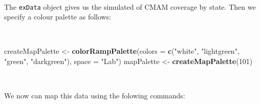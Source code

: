 \documentclass[12pt,a4paper,a4paper]{book}
\newenvironment{Shaded}{\begin{snugshade}}{\end{snugshade}}
\newcommand{\KeywordTok}[1]{\textcolor[rgb]{0.13,0.29,0.53}{\textbf{#1}}}
\newcommand{\DataTypeTok}[1]{\textcolor[rgb]{0.13,0.29,0.53}{#1}}
\newcommand{\DecValTok}[1]{\textcolor[rgb]{0.00,0.00,0.81}{#1}}
\newcommand{\StringTok}[1]{\textcolor[rgb]{0.31,0.60,0.02}{#1}}
\newcommand{\OperatorTok}[1]{\textcolor[rgb]{0.81,0.36,0.00}{\textbf{#1}}}
\newcommand{\NormalTok}[1]{#1}
\theoremstyle{definition}
\theoremstyle{definition}
\theoremstyle{definition}
\theoremstyle{remark}
\begin{document}
\begin{Shaded}
\end{Shaded}

~

The \texttt{exData} object gives us the simulated of CMAM coverage by
state. Then we specify a colour palette as follows:

~

\begin{Shaded}
\begin{Highlighting}[]
\NormalTok{createMapPalette <-}\StringTok{ }\KeywordTok{colorRampPalette}\NormalTok{(}\DataTypeTok{colors =} \KeywordTok{c}\NormalTok{(}\StringTok{"white"}\NormalTok{, }\StringTok{"lightgreen"}\NormalTok{, }
                                                \StringTok{"green"}\NormalTok{, }\StringTok{"darkgreen"}\NormalTok{), }
                                     \DataTypeTok{space =} \StringTok{"Lab"}\NormalTok{)}
\NormalTok{mapPalette <-}\StringTok{ }\KeywordTok{createMapPalette}\NormalTok{(}\DecValTok{101}\NormalTok{)}
\end{Highlighting}
\end{Shaded}

~

We now can map this data using the folowing commands:

~
\end{document}
